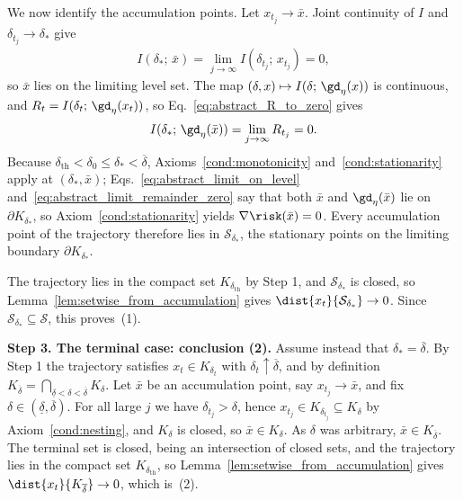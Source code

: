 \documentclass{article}
\begin{document}
We now identify the accumulation points. Let $x_{t_j}\to\bar x$. 
Joint continuity of $I$ and $\delta_{t_j}\to\delta_\ast$
give
\begin{align}
    I(\delta_\ast;\,\bar x)
    =\lim_{j\to\infty}I(\delta_{t_j};\,x_{t_j})
    =0,
    \label{eq:abstract_limit_on_level}
\end{align}
so $\bar x$ lies on the limiting level set. The map
$(\delta,x)\mapsto I(\delta;\,\gd_\eta(x))$ is continuous, and
$R_t=I(\delta_t;\,\gd_\eta(x_t))$, so Eq.~\eqref{eq:abstract_R_to_zero} gives
\begin{align}
    I(\delta_\ast;\,\gd_\eta(\bar x))
    =\lim_{j\to\infty}R_{t_j}
    =0.
    \label{eq:abstract_limit_remainder_zero}
\end{align}
Because $\delta_{\mathrm{th}}<\delta_0\le\delta_\ast<\overline\delta$,
Axioms~\ref{cond:monotonicity} and~\ref{cond:stationarity} apply at
$(\delta_\ast,\bar x)$; Eqs.~\eqref{eq:abstract_limit_on_level}
and~\eqref{eq:abstract_limit_remainder_zero} say that both $\bar x$ and
$\gd_\eta(\bar x)$ lie on $\partial K_{\delta_\ast}$, so
Axiom~\ref{cond:stationarity} yields
$\nabla\risk(\bar x)=0$. Every accumulation point of the trajectory therefore
lies in $\mathcal S_{\delta_\ast}$, the stationary points on the limiting
boundary $\partial K_{\delta_\ast}$.

The trajectory lies in the compact set $K_{\delta_{\mathrm{th}}}$ by Step 1,
and $\mathcal S_{\delta_\ast}$ is closed, so
Lemma~\ref{lem:setwise_from_accumulation} gives
$\dist{x_t}{\mathcal S_{\delta_\ast}}\to0$. Since
$\mathcal S_{\delta_\ast}\subseteq\mathcal S$, this proves~(1).

\textbf{Step 3. The terminal case: conclusion (2).}
Assume instead that $\delta_\ast=\overline\delta$. By Step 1 the trajectory
satisfies $x_t\in K_{\delta_t}$ with $\delta_t\uparrow\overline\delta$, and by
definition
$K_{\overline\delta}=\bigcap_{\underline\delta<\delta<\overline\delta}K_\delta$.
Let $\bar x$ be an accumulation point, say $x_{t_j}\to\bar x$, and fix
$\delta\in(\underline\delta,\overline\delta)$. For all large $j$ we have
$\delta_{t_j}>\delta$, hence $x_{t_j}\in K_{\delta_{t_j}}\subseteq K_\delta$
by Axiom~\ref{cond:nesting}, and $K_\delta$ is closed, so $\bar x\in K_\delta$.
As $\delta$ was arbitrary, $\bar x\in K_{\overline\delta}$. The terminal set is
closed, being an intersection of closed sets, and the trajectory lies in the
compact set $K_{\delta_{\mathrm{th}}}$, so
Lemma~\ref{lem:setwise_from_accumulation} gives
$\dist{x_t}{K_{\overline\delta}}\to 0$, which is~(2).
\end{document}
